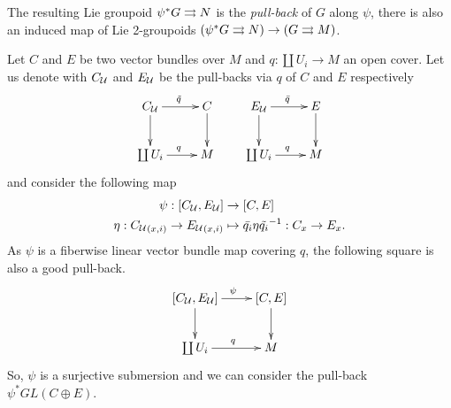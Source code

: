 The resulting Lie groupoid $\psi^*G\rightrightarrows N$ is the \emph{pull-back} of $G$ along $\psi$, there is also an induced map of Lie 2-groupoids $(\psi^*G\rightrightarrows N) \to (G\rightrightarrows M)$.

\begin{example}
Let $C$ and $E$ be two vector bundles over $M$ and $q: \coprod U_i \to M$ an open cover.
Let us denote with $C_{\mathcal{U}}$ and $E_{\mathcal{U}}$ be the pull-backs via $q$ of $C$ and $E$ respectively
\begin{equation}
\begin{gathered}
\xymatrix{
  C_\U \ar[r]^{\tilde q} \ar[d] & C \ar[d] \\
  \coprod U_i \ar[r]^q & M
} \qquad
\xymatrix{
  E_\U \ar[r]^{\bar q} \ar[d] & E \ar[d] \\
  \coprod U_i \ar[r]^q & M
}
\end{gathered}
\end{equation}
and consider the following map
\begin{align*}
\psi: [C_{\mathcal{U}},E_{\mathcal{U}}] &\to [C,E] \\
\eta: {C_{\mathcal{U}}}_{(x,i)} \to {E_{\mathcal{U}}}_{(x,i)} &\mapsto \bar{q_i}\eta\tilde{q_i}^{-1}: C_x \to E_x \text{.}
\end{align*}
As $\psi$ is a fiberwise linear vector bundle map covering $q$, the following square is also a good pull-back.
\begin{equation}
\begin{gathered}
\xymatrix{
  [C_\U,E_\U] \ar[r]^\psi \ar[d] & [C,E] \ar[d] \\
  \coprod U_i \ar[r]^q & M
}
\end{gathered}
\end{equation}
So, $\psi$ is a surjective submersion and we can consider the pull-back $\psi^* GL(C\oplus E)$.


\end{example}
